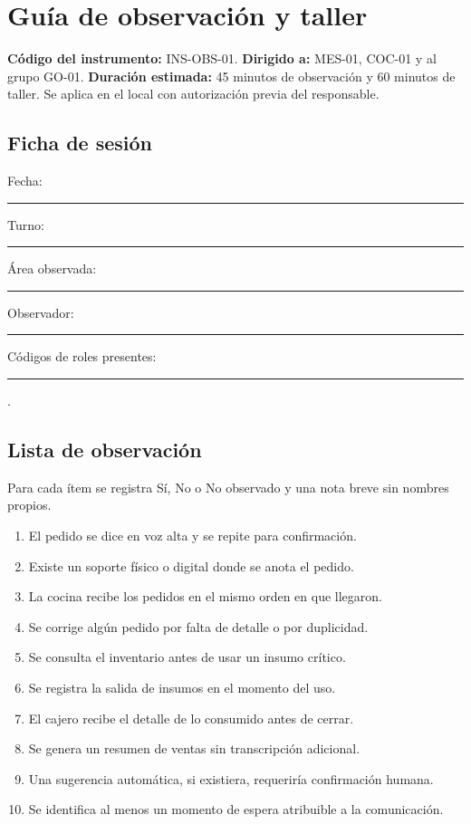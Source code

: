 \providecommand{\iquest}[1]{¿#1}
\section{Gu\'ia de observaci\'on y taller}

\textbf{C\'odigo del instrumento:} INS-OBS-01. \textbf{Dirigido a:} MES-01, COC-01 y al grupo GO-01.
\textbf{Duración estimada:} 45 minutos de observaci\'on y 60 minutos de taller. Se aplica en el local con autorizaci\'on previa del responsable.

\subsection*{Ficha de sesi\'on}
Fecha: \rule{2.8cm}{0.4pt}\quad Turno: \rule{2.2cm}{0.4pt}\quad \'Area observada: \rule{3cm}{0.4pt}\quad
Observador: \rule{3cm}{0.4pt}\quad C\'odigos de roles presentes: \rule{4cm}{0.4pt}.

\subsection*{Lista de observaci\'on}
Para cada \'item se registra S\'i, No o No observado y una nota breve sin nombres propios.

\begin{enumerate}[leftmargin=18pt,itemsep=1pt]
    \item El pedido se dice en voz alta y se repite para confirmación.
    \item Existe un soporte f\'isico o digital donde se anota el pedido.
    \item La cocina recibe los pedidos en el mismo orden en que llegaron.
    \item Se corrige alg\'un pedido por falta de detalle o por duplicidad.
    \item Se consulta el inventario antes de usar un insumo cr\'itico.
    \item Se registra la salida de insumos en el momento del uso.
    \item El cajero recibe el detalle de lo consumido antes de cerrar.
    \item Se genera un resumen de ventas sin transcripci\'on adicional.
    \item Una sugerencia autom\'atica, si existiera, requerir\'ia confirmación humana.
    \item Se identifica al menos un momento de espera atribuible a la comunicaci\'on.
\end{enumerate}

